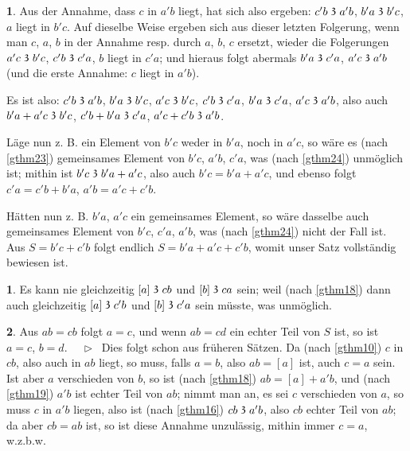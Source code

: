 \documentclass[leqno,hidelinks]{article}
\theoremstyle{definition}
\newtheorem{satz}{\protect\satzname}
\newtheorem*{zusatz}{\protect\zusatzname}
\newcommand{\satzname}{}
\newcommand{\zusatzname}{}
\renewcommand{\satzname}{\hspace{-4pt}.\ Satz}%
\renewcommand{\zusatzname}{Zusatz}%
\renewcommand{\satzname}{\hspace{-4pt}.\ Theorem}%
\renewcommand{\zusatzname}{Corollary}%
\newcommand\Beweis{\medskip \newline $ \phantom{'.'} \rhd \ $}%
\newcommand\TeilVon{\mathrel{\raisebox{0.45ex}{$\mathfrak{3}$}}}
\newcommand{\sref}[1]{\underline{\ref{#1}}}%
\begin{document}
\begin{paracol}{2}
\begin{satz}
Aus der Annahme, dass $c$ in $a'b$ liegt, hat sich also ergeben: $c'b \TeilVon a'b$,
$b'a \TeilVon b'c$, $a$ liegt in $b'c$. Auf dieselbe Weise ergeben sich aus
dieser letzten Folgerung, wenn man $c$, $a$, $b$ in der Annahme resp. durch $a$,
$b$, $c$ ersetzt, wieder die Folgerungen $a'c \TeilVon b'c$, $c'b \TeilVon c'a$,
$b$ liegt in $c'a$; und hieraus folgt abermals $b'a \TeilVon c'a$,
$a'c \TeilVon a'b$ (und die erste Annahme: $c$ liegt in $a'b$).

Es ist also: $c'b \TeilVon a'b$, $b'a \TeilVon b'c$, $a'c \TeilVon b'c$,
$c'b \TeilVon c'a$, $b'a \TeilVon c'a$, $a'c \TeilVon a'b$, also auch
$b'a + a'c \TeilVon b'c$, $c'b + b'a \TeilVon c'a$, $a'c + c'b \TeilVon a'b$.

\newpage

Läge nun z. B. ein Element von $b'c$ weder in $b'a$, noch in $a'c$,
so wäre es (nach \sref{gthm23}) gemeinsames Element von $b'c$, $a'b$, $c'a$, was
(nach \sref{gthm24}) unmöglich ist; mithin ist $b'c \TeilVon b'a + a'c$, also auch
$b'c = b'a + a'c$, und ebenso folgt $c'a = c'b + b'a$, $a'b = a'c + c'b$.

Hätten nun z. B. $b'a$, $a'c$ ein gemeinsames Element, so wäre dasselbe
auch gemeinsames Element von $b'c$, $c'a$, $a'b$, was (nach \sref{gthm24}) nicht
der Fall ist. Aus $S = b'c + c'b$ folgt endlich $S = b'a + a'c + c'b$,
womit unser Satz vollständig bewiesen ist.
\end{satz}

\begin{zusatz}\label{zusatz2}
Es kann nie gleichzeitig $[a] \TeilVon cb$ und $[b] \TeilVon ca$ sein;
weil (nach \sref{gthm18}) dann auch gleichzeitig $[a] \TeilVon c'b$ und
$[b] \TeilVon c'a$  sein müsste, was unmöglich.
\end{zusatz}

\begin{satz}\label{gthm26}
Aus $ab = cb$ folgt $a = c$, und wenn $ab = cd$ ein echter Teil von $S$ ist,
so ist $a = c$, $b = d$.
\Beweis
Dies folgt schon aus früheren Sätzen. Da (nach \sref{gthm10}) $c$ in $cb$, also
auch in $ab$ liegt, so muss, falls $a = b$, also $ab = [a]$ ist, auch $c = a$ sein.
Ist aber $a$ verschieden von $b$, so ist (nach \sref{gthm18}) $ab = [a] + a'b$, und
(nach \sref{gthm19}) $a'b$ ist echter Teil von $ab$; nimmt man an, es sei $c$
verschieden von $a$, so muss $c$ in $a'b$ liegen, also ist (nach \sref{gthm16})
$cb \TeilVon a'b$, also $cb$ echter Teil von $ab$; da aber $cb = ab$ ist, so ist
diese Annahme unzulässig, mithin immer $c = a$, w.z.b.w.


\end{satz}
\end{paracol}
\end{document}
